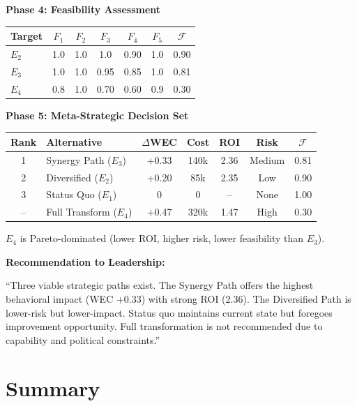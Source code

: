 \begin{tcolorbox}[colback=gray!5!white, colframe=gray!75!black,
    title=Worked Example: GreenCorp Strategic Options]
\textbf{Phase 4: Feasibility Assessment}

\begin{center}
\begin{tabular}{lccccc|c}
\textbf{Target} & $F_1$ & $F_2$ & $F_3$ & $F_4$ & $F_5$ & $\mathcal{F}$ \\
\hline
$E_2$ & 1.0 & 1.0 & 1.0 & 0.90 & 1.0 & 0.90 \\
$E_3$ & 1.0 & 1.0 & 0.95 & 0.85 & 1.0 & 0.81 \\
$E_4$ & 0.8 & 1.0 & 0.70 & 0.60 & 0.9 & 0.30 \\
\end{tabular}
\end{center}

\textbf{Phase 5: Meta-Strategic Decision Set}

\begin{center}
\begin{tabular}{clccccc}
\textbf{Rank} & \textbf{Alternative} & \textbf{$\Delta$WEC} & \textbf{Cost} & \textbf{ROI} & \textbf{Risk} & \textbf{$\mathcal{F}$} \\
\hline
1 & Synergy Path ($E_3$) & +0.33 & 140k & 2.36 & Medium & 0.81 \\
2 & Diversified ($E_2$) & +0.20 & 85k & 2.35 & Low & 0.90 \\
3 & Status Quo ($E_1$) & 0 & 0 & -- & None & 1.00 \\
\hline
-- & Full Transform ($E_4$) & +0.47 & 320k & 1.47 & High & 0.30 \\
\end{tabular}
\end{center}

$E_4$ is Pareto-dominated (lower ROI, higher risk, lower feasibility than $E_3$).

\textbf{Recommendation to Leadership:}

``Three viable strategic paths exist. The Synergy Path offers the highest behavioral
impact (WEC +0.33) with strong ROI (2.36). The Diversified Path is lower-risk but
lower-impact. Status quo maintains current state but foregoes improvement opportunity.
Full transformation is not recommended due to capability and political constraints.''

\end{tcolorbox}

\section{Summary}
\label{sec:meq-summary}

